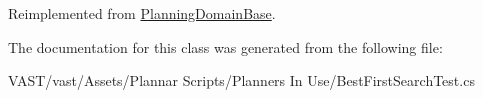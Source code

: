 Reimplemented from \hyperlink{class_planning_domain_base_a56907006c1e4a4071f58da65705792d1}{Planning\-Domain\-Base}.



The documentation for this class was generated from the following file\-:\begin{DoxyCompactItemize}
\item 
V\-A\-S\-T/vast/\-Assets/\-Plannar Scripts/\-Planners In Use/Best\-First\-Search\-Test.\-cs\end{DoxyCompactItemize}
